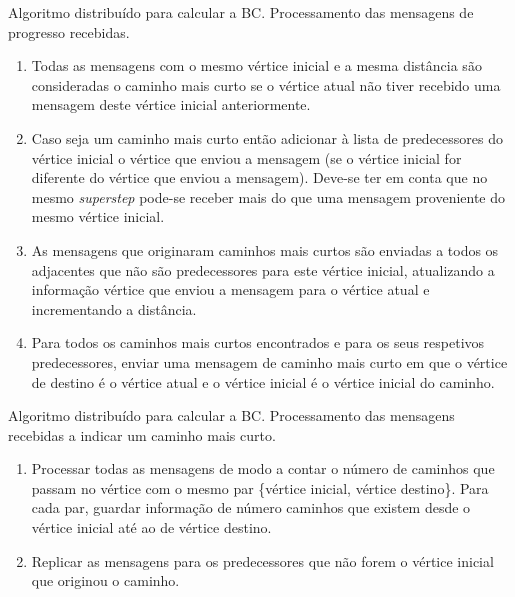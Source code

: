 \begin{algorithm}
  \caption{Algoritmo distribuído para calcular a BC. Processamento das 
mensagens de progresso recebidas.}
  \label{alg:msgprogbc}
  \begin{enumerate}
		\item Todas as mensagens com o mesmo vértice inicial e a mesma distância são consideradas o caminho mais curto se o vértice atual não tiver recebido uma mensagem deste vértice inicial anteriormente.
    \item Caso seja um caminho mais curto então adicionar à lista de 
predecessores do vértice inicial o vértice que enviou a mensagem (se o 
vértice inicial for diferente do vértice que enviou a mensagem). Deve-se 
ter em conta que no mesmo \textit{superstep} pode-se receber mais do que uma 
mensagem proveniente do mesmo vértice inicial.
    \item As mensagens que originaram caminhos mais curtos são enviadas a todos os adjacentes que não são predecessores para este vértice inicial,  atualizando a informação vértice que enviou a mensagem para o vértice atual e incrementando a distância.
    \item Para todos os caminhos mais curtos encontrados e para os 
seus respetivos predecessores, enviar uma mensagem de caminho mais curto em que o vértice de destino é o vértice atual e o vértice inicial é o vértice inicial do caminho.
  \end{enumerate}
\end{algorithm}

\begin{algorithm}
  \caption{Algoritmo distribuído para calcular a BC. Processamento das 
mensagens recebidas a indicar um caminho mais curto.}
  \label{alg:msgpathbc}
  \begin{enumerate}  
     \item Processar todas as mensagens de modo a contar o número de 
caminhos que passam no vértice com o mesmo par \{vértice inicial, vértice destino\}. 
Para cada par, guardar informação de número caminhos que existem desde o 
vértice inicial até ao de vértice destino.
     \item Replicar as mensagens para os predecessores que não forem o vértice inicial que originou o caminho.
  \end{enumerate}
\end{algorithm}

